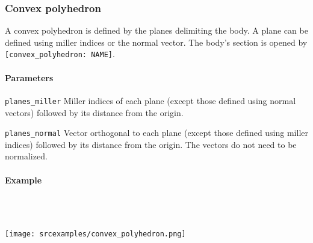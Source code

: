 \subsubsection{Convex polyhedron}

A convex polyhedron is defined by the planes delimiting the body. A plane can be defined using miller indices or the normal vector. The body's section is opened by \lstinline{[convex_polyhedron: NAME]}.

\paragraph{Parameters}

\begin{description}
 \item{\lstinline{planes_miller}} Miller indices of each plane (except those defined using normal vectors) followed by its distance from the origin.
 \item{\lstinline{planes_normal}} Vector orthogonal to each plane (except those defined using miller indices) followed by its distance from the origin. The vectors do not need to be normalized.
\end{description} 

\paragraph{Example}\


\ \\\texttt{[image: srcexamples/convex\_polyhedron.png]}